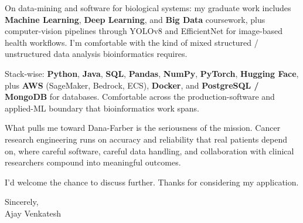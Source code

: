 \documentclass[letterpaper,11pt]{article}
\begin{document}
On data-mining and software for biological systems: my graduate work includes \textbf{Machine Learning}, \textbf{Deep Learning}, and \textbf{Big Data} coursework, plus computer-vision pipelines through YOLOv8 and EfficientNet for image-based health workflows. I'm comfortable with the kind of mixed structured / unstructured data analysis bioinformatics requires.

Stack-wise: \textbf{Python}, \textbf{Java}, \textbf{SQL}, \textbf{Pandas}, \textbf{NumPy}, \textbf{PyTorch}, \textbf{Hugging Face}, plus \textbf{AWS} (SageMaker, Bedrock, ECS), \textbf{Docker}, and \textbf{PostgreSQL / MongoDB} for databases. Comfortable across the production-software and applied-ML boundary that bioinformatics work spans.

What pulls me toward Dana-Farber is the seriousness of the mission. Cancer research engineering runs on accuracy and reliability that real patients depend on, where careful software, careful data handling, and collaboration with clinical researchers compound into meaningful outcomes.

I'd welcome the chance to discuss further. Thanks for considering my application.

\vspace{12pt}
Sincerely, \\
Ajay Venkatesh
\end{document}
